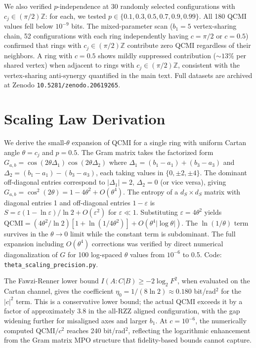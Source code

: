 \documentclass[aps,prl,superscriptaddress,nofootinbib]{revtex4-2}
\begin{document}
We also verified $p$-independence at 30 randomly selected configurations with $c_j \in (\pi/2)\mathbb{Z}$: for each, we tested $p \in \{0.1, 0.3, 0.5, 0.7, 0.9, 0.99\}$. All 180 QCMI values fell below $10^{-9}$ bits. The mixed-parameter scan ($b_1 = 5$ vertex-sharing chain, 52 configurations with each ring independently having $c = \pi/2$ or $c = 0.5$) confirmed that rings with $c_j \in (\pi/2)\mathbb{Z}$ contribute zero QCMI regardless of their neighbors. A ring with $c = 0.5$ shows mildly suppressed contribution ($\sim13\%$ per shared vertex) when adjacent to rings with $c_j \in (\pi/2)\mathbb{Z}$, consistent with the vertex-sharing anti-synergy quantified in the main text. Full datasets are archived at Zenodo \texttt{10.5281/zenodo.20619265}.


\section{Scaling Law Derivation}


We derive the small-$\theta$ expansion of QCMI for a single ring with uniform Cartan angle $\theta = c_j$ and $p = 0.5$. The Gram matrix takes the factorized form $G_{a,b} = \cos(2\theta\Delta_1) \cos(2\theta\Delta_2)$ where $\Delta_1 = (b_1-a_1) + (b_3-a_3)$ and $\Delta_2 = (b_1-a_1) - (b_3-a_3)$, each taking values in $\{0, \pm2, \pm4\}$. The dominant off-diagonal entries correspond to $|\Delta_1| = 2$, $\Delta_2 = 0$ (or vice versa), giving $G_{a,b} = \cos^2(2\theta) = 1 - 4\theta^2 + O(\theta^4)$. The entropy of a $d_S \times d_S$ matrix with diagonal entries 1 and off-diagonal entries $1 - \varepsilon$ is $S = \varepsilon(1 - \ln\varepsilon)/\ln 2 + O(\varepsilon^2)$ for $\varepsilon \ll 1$. Substituting $\varepsilon = 4\theta^2$ yields $\text{QCMI} = (4\theta^2/\ln 2)[1 + \ln(1/4\theta^2)] + O(\theta^4|\log\theta|)$. The $\ln(1/\theta)$ term survives in the $\theta\to 0$ limit while the constant term is subdominant. The full expansion including $O(\theta^4)$ corrections was verified by direct numerical diagonalization of $G$ for 100 log-spaced $\theta$ values from $10^{-6}$ to 0.5. Code: \texttt{theta\_scaling\_precision.py}.


The Fawzi-Renner lower bound $I(A{:}C|B) \geq -2 \log_2 F^2$, when evaluated on the Cartan channel, gives the coefficient $\eta_0 = 1/(8 \ln 2) \approx 0.180$ bit/rad$^2$ for the $|c|^2$ term. This is a conservative lower bound; the actual QCMI exceeds it by a factor of approximately 3.8 in the all-RZZ aligned configuration, with the gap widening further for misaligned axes and larger $b_1$. At $c = 10^{-6}$, the numerically computed $\text{QCMI}/c^2$ reaches 240 bit/rad$^2$, reflecting the logarithmic enhancement from the Gram matrix MPO structure that fidelity-based bounds cannot capture.
\end{document}

